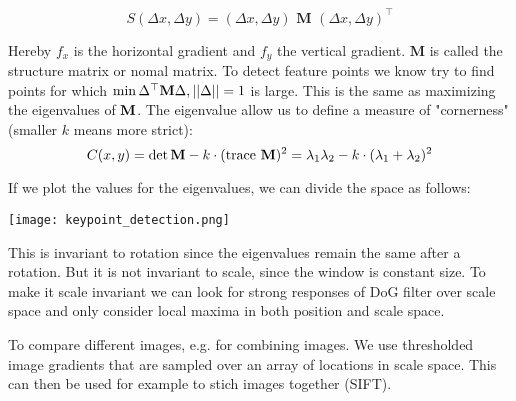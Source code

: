 $$S(\Delta x, \Delta y) = (\Delta x, \Delta y) \textbf{ M } (\Delta x, \Delta y)^\top$$

Hereby $f_x$ is the horizontal gradient and $f_y$ the vertical gradient. $\textbf{M}$ is called the structure matrix or nomal matrix. To detect feature points we know try to find points for which $\min \Delta^\top \textbf M \Delta, || \Delta || = 1 $ is large. This is the same as maximizing the eigenvalues of $\textbf M$. The eigenvalue allow us to define a measure of "cornerness" (smaller $k$ means more strict):
$$C(x,y) = \det \textbf M - k \cdot (\text{trace } \textbf M)^2 = \lambda_1 \lambda_2 - k \cdot (\lambda_1 + \lambda_2)^2$$

If we plot the values for the eigenvalues, we can divide the space as follows:
\begin{center}
	\texttt{[image: keypoint\_detection.png]}
\end{center}

This is invariant to rotation since the eigenvalues remain the same after a rotation. But it is not invariant to scale, since the window is constant size. To make it scale invariant we can look for strong responses of DoG filter over scale space and only consider local maxima in both position and scale space.\medskip

To compare different images, e.g. for combining images. We use thresholded image gradients that are sampled over an array of locations in scale space. This can then be used for example to stich images together (SIFT).






